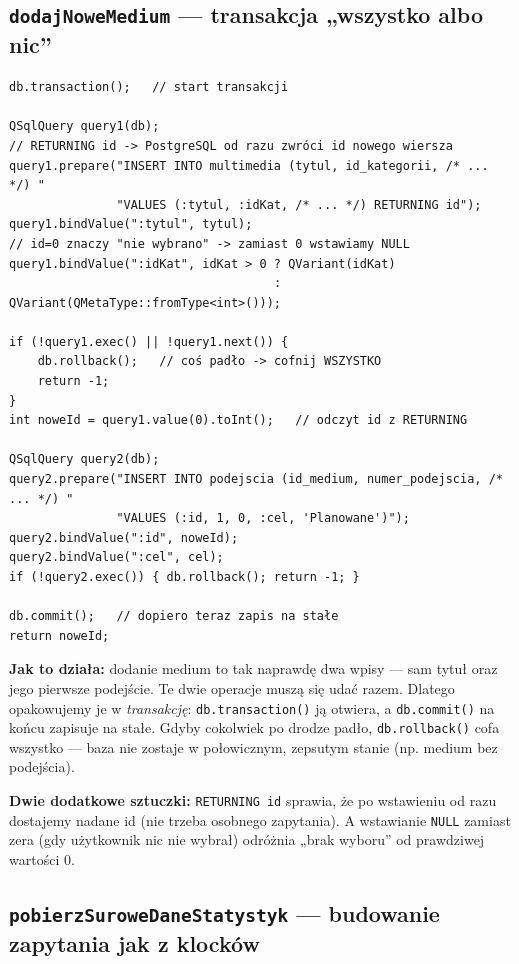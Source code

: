\documentclass[11pt,a4paper]{article}
\begin{document}
\subsection{\texttt{dodajNoweMedium} --- transakcja „wszystko albo nic”}

\begin{lstlisting}[caption={Dwa wpisy do bazy w jednej transakcji}]
db.transaction();   // start transakcji

QSqlQuery query1(db);
// RETURNING id -> PostgreSQL od razu zwróci id nowego wiersza
query1.prepare("INSERT INTO multimedia (tytul, id_kategorii, /* ... */) "
               "VALUES (:tytul, :idKat, /* ... */) RETURNING id");
query1.bindValue(":tytul", tytul);
// id=0 znaczy "nie wybrano" -> zamiast 0 wstawiamy NULL
query1.bindValue(":idKat", idKat > 0 ? QVariant(idKat)
                                     : QVariant(QMetaType::fromType<int>()));

if (!query1.exec() || !query1.next()) {
    db.rollback();   // coś padło -> cofnij WSZYSTKO
    return -1;
}
int noweId = query1.value(0).toInt();   // odczyt id z RETURNING

QSqlQuery query2(db);
query2.prepare("INSERT INTO podejscia (id_medium, numer_podejscia, /* ... */) "
               "VALUES (:id, 1, 0, :cel, 'Planowane')");
query2.bindValue(":id", noweId);
query2.bindValue(":cel", cel);
if (!query2.exec()) { db.rollback(); return -1; }

db.commit();   // dopiero teraz zapis na stałe
return noweId;
\end{lstlisting}

\textbf{Jak to działa:} dodanie medium to tak naprawdę dwa wpisy --- sam tytuł
oraz jego pierwsze podejście. Te dwie operacje muszą się udać razem. Dlatego
opakowujemy je w \emph{transakcję}: \texttt{db.transaction()} ją otwiera,
a \texttt{db.commit()} na końcu zapisuje na stałe. Gdyby cokolwiek po drodze padło,
\texttt{db.rollback()} cofa wszystko --- baza nie zostaje w połowicznym, zepsutym
stanie (np. medium bez podejścia).

\textbf{Dwie dodatkowe sztuczki:} \texttt{RETURNING id} sprawia, że po wstawieniu
od razu dostajemy nadane id (nie trzeba osobnego zapytania). A wstawianie
\texttt{NULL} zamiast zera (gdy użytkownik nic nie wybrał) odróżnia „brak wyboru”
od prawdziwej wartości 0.

\subsection{\texttt{pobierzSuroweDaneStatystyk} --- budowanie zapytania jak z klocków}
\end{document}
